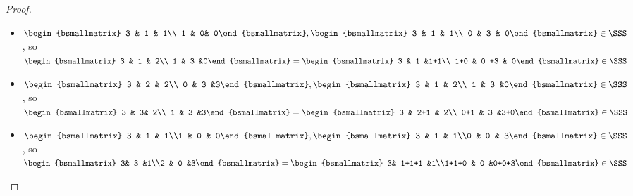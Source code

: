 \documentclass[10pt,a4paper]{article}
\theoremstyle{definition}
\theoremstyle{remark}
\begin{document}
\begin{proof}
\begin{itemize}
$\begin{bsmallmatrix} 3 & 2 & 2\\ 0 & 3 &3\end{bsmallmatrix}=\begin{bsmallmatrix} 2+1 & 2 & 2\\ 0 & 3+0 & 1 +2\end{bsmallmatrix}\in \SSS$
\item $\begin{bsmallmatrix} 3 & 1 & 1\\ 1 & 0& 0\end{bsmallmatrix},\begin{bsmallmatrix} 3 & 1 & 1\\ 0 & 3 & 0\end{bsmallmatrix}\in \SSS$, 
so $\begin{bsmallmatrix} 3 & 1 & 2\\ 1 & 3 &0\end{bsmallmatrix}=\begin{bsmallmatrix} 3 & 1 &1+1\\ 1+0 & 0 +3 & 0\end{bsmallmatrix}\in \SSS$
\item $\begin{bsmallmatrix} 3 & 2 & 2\\ 0 & 3 &3\end{bsmallmatrix},\begin{bsmallmatrix} 3 & 1 & 2\\ 1 & 3 &0\end{bsmallmatrix}\in \SSS$, so 
$\begin{bsmallmatrix} 3 & 3& 2\\ 1 & 3 &3\end{bsmallmatrix}=\begin{bsmallmatrix} 3 & 2+1 & 2\\ 0+1 & 3 &3+0\end{bsmallmatrix}\in \SSS$
\item $\begin{bsmallmatrix} 3 & 1 & 1\\1 & 0 & 0\end{bsmallmatrix}, \begin{bsmallmatrix} 3 & 1 & 1\\0 & 0 & 3\end{bsmallmatrix}\in \SSS$, so
 $\begin{bsmallmatrix} 3& 3 &1\\2 & 0 &3\end{bsmallmatrix}=\begin{bsmallmatrix} 3& 1+1+1 &1\\1+1+0 & 0 &0+0+3\end{bsmallmatrix}\in \SSS$

\end{itemize}
\end{proof}
\end{document}
